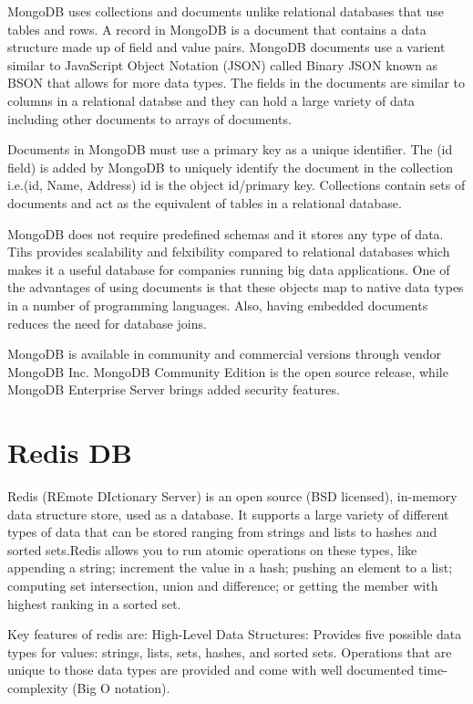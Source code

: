 MongoDB uses collections and documents unlike relational databases that use tables and rows. A record in MongoDB is a document that contains a data structure made up of field and value pairs. MongoDB documents use a varient similar to JavaScript Object Notation (JSON) called Binary JSON known as BSON that allows for more data types. The fields in the documents are similar to columns in a relational databse and they can hold a large variety of data including other documents to arrays of documents.\newline

Documents in MongoDB must use a primary key as a unique identifier.
The (id field) is added by MongoDB to uniquely identify the document in the collection i.e.(id, Name, Address) id is the object id/primary key. Collections contain sets of documents and act as the equivalent of tables in a relational database.\newline

MongoDB does not require predefined schemas and it stores any type of data. Tihs provides scalability and felxibility compared to relational databases which makes it a useful database for companies running big data applications. One of the advantages of using documents is that these objects map to native data types in a number of programming languages. Also, having embedded documents reduces the need for database joins.\newline

MongoDB is available in community and commercial versions through vendor MongoDB Inc. MongoDB Community Edition is the open source release, while MongoDB Enterprise Server brings added security features.\newline
\cite{S174228761630031720160601}

\section {Redis DB}
Redis (REmote DIctionary Server) is an open source (BSD licensed), in-memory data structure store, used as a database. It supports a large variety of different types of data that can be stored ranging from strings and lists to hashes and sorted sets.Redis allows you to run atomic operations on these types, like appending a string; increment the value in a hash; pushing an element to a list; computing set intersection, union and difference; or getting the member with highest ranking in a sorted set.
\newline

Key features of redis are:\newline
High-Level Data Structures:  Provides five possible data types for values: strings, lists, sets, hashes, and sorted sets. Operations that are unique to those data types are provided and come with well documented time-complexity (Big O notation).\newline

